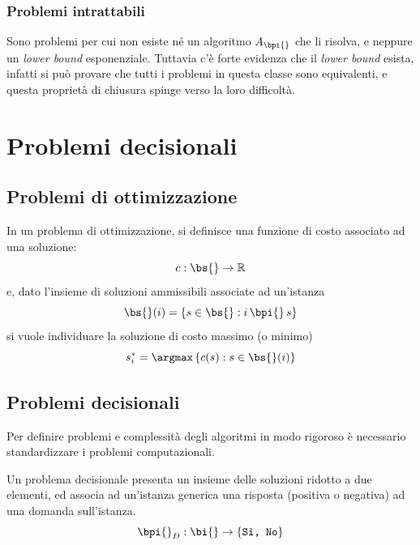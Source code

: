 \subsubsection{Problemi intrattabili}

Sono problemi per cui non esiste né un algoritmo $A_{\bpi{}}$ che li risolva, e neppure un \emph{lower bound} esponenziale.
Tuttavia c'è forte evidenza che il \emph{lower bound} esista, infatti si può provare che tutti i problemi in questa classe sono equivalenti, e questa proprietà di chiusura spinge verso la loro difficoltà.

\section{Problemi decisionali}

\subsection{Problemi di ottimizzazione}

In un problema di ottimizzazione, si definisce una funzione di costo associato ad una soluzione:
\begin{equation*}
    c : \bs{} \to \mathbb{R}
\end{equation*}
e, dato l'insieme di soluzioni ammissibili associate ad un'istanza
\begin{equation*}
    \bs{} (i) = \left\{ s \in \bs{} : i \, \bpi{} \, s \right\}
\end{equation*}
si vuole individuare la soluzione di costo massimo (o minimo)
\begin{equation*}
    s_{i}^{*} = \argmax \left\{ c(s) : s \in \bs{} (i) \right\}
\end{equation*}

\subsection{Problemi decisionali}

Per definire problemi e complessità degli algoritmi in modo rigoroso è necessario standardizzare i problemi computazionali.

Un problema decisionale presenta un insieme delle soluzioni ridotto a due elementi, ed associa ad un'istanza generica una risposta (positiva o negativa) ad una domanda sull'istanza.
\begin{equation*}
    \bpi{}_{D} : \bi{} \to \left\{ \texttt{Sì, No} \right\}
\end{equation*}

